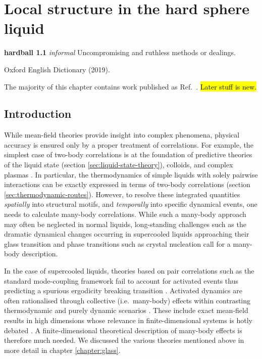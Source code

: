 \documentclass[11pt,twoside]{report}
\begin{document}
\chapter{Local structure in the hard sphere liquid}
\epigraph{\textbf{hardball 1.1} \emph{informal} Uncompromising and ruthless methods or dealings.}{Oxford English Dictionary (2019).}
\label{chapter:morphometric-applications}

The majority of this chapter contains work published as Ref.\ \cite{RobinsonPRL2019}.
\hl{Later stuff is new.}

\section{Introduction}

While mean-field theories provide insight into complex phenomena, physical accuracy is ensured only by a proper treatment of correlations.
For example, the simplest case of two-body correlations is at the foundation of predictive theories of the liquid state (section \ref{sec:liquid-state-theory}), colloids, and complex plasmas \cite{LikosPR2001,Ivlev2012}.
In particular, the thermodynamics of simple liquids with solely pairwise interactions can be exactly expressed in terms of two-body correlations (section \ref{sec:thermodynamic-routes}).
However, to resolve these integrated quantities \emph{spatially} into structural motifs, and \emph{temporally} into specific dynamical events, one needs to calculate many-body correlations.
While such a many-body approach may often be neglected in normal liquids, long-standing challenges such as the dramatic dynamical changes occurring in supercooled liquids approaching their glass transition \cite{BerthierRMP2011,RoyallPR2015} and phase transitions such as crystal nucleation \cite{RussoSR2012} call for a many-body description.

In the case of supercooled liquids, theories based on pair correlations such as the standard mode-coupling framework \cite{Gotze2009} fail to account for activated events thus predicting a spurious ergodicity breaking transition \cite{BrambillaPRL2009,HallettNC2018}.
Activated dynamics are often rationalised through collective (i.e.\ many-body) effects within contrasting thermodynamic and purely dynamic scenarios \cite{LubchenkoARPC2007,TarjusJPCM2005,BiroliPRL2006,JanssenPRL2015,SzamelPTEP2013,ChandlerARPC2010}.
These include exact mean-field results in high dimensions \cite{ParisiRMP2010,CharbonneauARCMP2017} whose relevance in finite-dimensional systems is hotly debated \cite{WyartPRL2017}.
A finite-dimensional theoretical description of many-body effects is therefore much needed.
We discussed the various theories mentioned above in more detail in chapter \ref{chapter:glass}.
\end{document}
